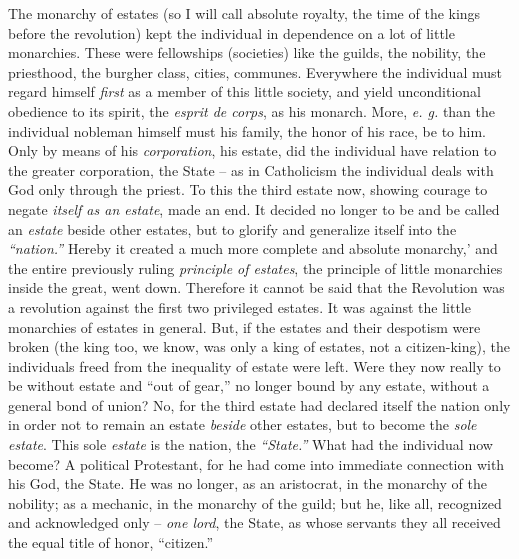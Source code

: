 \documentclass[12pt,a4paper]{book}
\begin{document}
The monarchy of estates (so I will call absolute royalty, the time of the 
kings before the revolution) kept the individual in dependence on a lot of 
little monarchies. These were fellowships (societies) like the guilds, the 
nobility, the priesthood, the burgher class, cities, communes. Everywhere the 
individual must regard himself \textit{first} as a member of this little 
society, and yield unconditional obedience to its spirit, the \textit{esprit 
de corps}, as his monarch. More, \textit{e. g.} than the individual nobleman 
himself must his family, the honor of his race, be to him. Only by means of 
his \textit{corporation}, his estate, did the individual have relation to the 
greater corporation, the State -- as in Catholicism the individual deals with 
God only through the priest. To this the third estate now, showing courage to 
negate \textit{itself as an estate}, made an end. It decided no longer to be 
and be called an \textit{estate} beside other estates, but to glorify and 
generalize itself into the \textit{``nation.''} Hereby it created a much 
more complete and absolute monarchy,' and the entire previously ruling 
\textit{principle of estates}, the principle of little monarchies inside the 
great, went down. Therefore it cannot be said that the Revolution was a 
revolution against the first two privileged estates. It was against the little 
monarchies of estates in general. But, if the estates and their despotism were 
broken (the king too, we know, was only a king of estates, not a 
citizen-king), the individuals freed from the inequality of estate were left. 
Were they now really to be without estate and ``out of gear,'' no longer 
bound by any estate, without a general bond of union? No, for the third estate 
had declared itself the nation only in order not to remain an estate 
\textit{beside} other estates, but to become the \textit{sole estate}. This 
sole \textit{estate} is the nation, the \textit{``State.''} What had the 
individual now become? A political Protestant, for he had come into immediate 
connection with his God, the State. He was no longer, as an aristocrat, in the 
monarchy of the nobility; as a mechanic, in the monarchy of the guild; but he, 
like all, recognized and acknowledged only -- \textit{one lord}, the State, as 
whose servants they all received the equal title of honor, ``citizen.''
\end{document}
